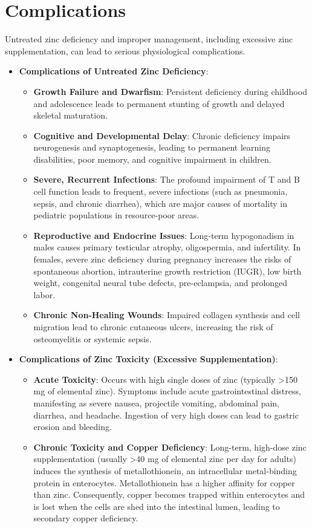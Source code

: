 \section*{Complications}
Untreated zinc deficiency and improper management, including excessive zinc supplementation, can lead to serious physiological complications.
\begin{itemize}
    \item \textbf{Complications of Untreated Zinc Deficiency}:
    \begin{itemize}
        \item \textbf{Growth Failure and Dwarfism}: Persistent deficiency during childhood and adolescence leads to permanent stunting of growth and delayed skeletal maturation.
        \item \textbf{Cognitive and Developmental Delay}: Chronic deficiency impairs neurogenesis and synaptogenesis, leading to permanent learning disabilities, poor memory, and cognitive impairment in children.
        \item \textbf{Severe, Recurrent Infections}: The profound impairment of T and B cell function leads to frequent, severe infections (such as pneumonia, sepsis, and chronic diarrhea), which are major causes of mortality in pediatric populations in resource-poor areas.
        \item \textbf{Reproductive and Endocrine Issues}: Long-term hypogonadism in males causes primary testicular atrophy, oligospermia, and infertility. In females, severe zinc deficiency during pregnancy increases the risks of spontaneous abortion, intrauterine growth restriction (IUGR), low birth weight, congenital neural tube defects, pre-eclampsia, and prolonged labor.
        \item \textbf{Chronic Non-Healing Wounds}: Impaired collagen synthesis and cell migration lead to chronic cutaneous ulcers, increasing the risk of osteomyelitis or systemic sepsis.
    \end{itemize}
    \item \textbf{Complications of Zinc Toxicity (Excessive Supplementation)}:
    \begin{itemize}
        \item \textbf{Acute Toxicity}: Occurs with high single doses of zinc (typically >150 mg of elemental zinc). Symptoms include acute gastrointestinal distress, manifesting as severe nausea, projectile vomiting, abdominal pain, diarrhea, and headache. Ingestion of very high doses can lead to gastric erosion and bleeding.
        \item \textbf{Chronic Toxicity and Copper Deficiency}: Long-term, high-dose zinc supplementation (usually >40 mg of elemental zinc per day for adults) induces the synthesis of metallothionein, an intracellular metal-binding protein in enterocytes. Metallothionein has a higher affinity for copper than zinc. Consequently, copper becomes trapped within enterocytes and is lost when the cells are shed into the intestinal lumen, leading to secondary copper deficiency.

\end{itemize}
\end{itemize}
